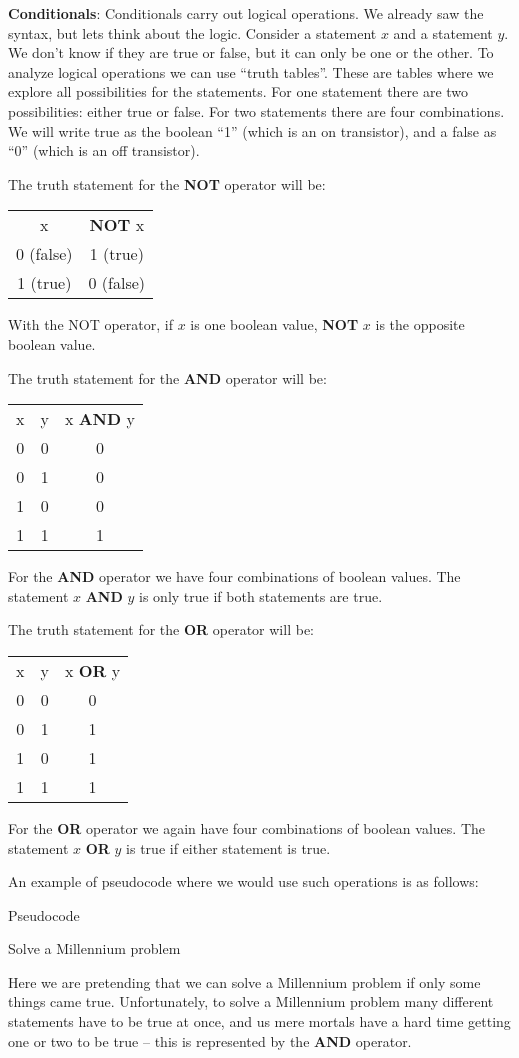 \documentclass[reqno]{amsart}
\theoremstyle{definition}
\begin{document}
\textbf{Conditionals}:  Conditionals carry out logical operations.  We already saw the syntax, but lets think about the logic.  Consider a statement $x$ and a statement $y$.  We don't know if they are true or false, but it can only be one or the other.  To analyze logical operations we can use ``truth tables''.  These are tables where we explore all possibilities for the statements.  For one statement there are two possibilities: either true or false.  For two statements there are four combinations.  We will write true as the boolean ``1'' (which is an on transistor), and a false as ``0'' (which is an off transistor).

The truth statement for the \textbf{NOT} operator will be:

\begin{tabular}{c|c}
x & \textbf{NOT} x\\
0 (false) & 1 (true)\\
1 (true) & 0 (false)
\end{tabular}

With the NOT operator, if $x$ is one boolean value, \textbf{NOT} $x$ is the opposite boolean value.

The truth statement for the \textbf{AND} operator will be:

\begin{tabular}{cc|c}
x & y & x \textbf{AND} y\\
0 & 0 & 0\\
0 & 1 & 0\\
1 & 0 & 0\\
1 & 1 & 1
\end{tabular}

For the \textbf{AND} operator we have four combinations of boolean values.  The statement $x$ \textbf{AND} $y$ is only true if both statements are true.

The truth statement for the \textbf{OR} operator will be:

\begin{tabular}{cc|c}
x & y & x \textbf{OR} y\\
0 & 0 & 0\\
0 & 1 & 1\\
1 & 0 & 1\\
1 & 1 & 1
\end{tabular}

For the \textbf{OR} operator we again have four combinations of boolean values.  The statement $x$ \textbf{OR} $y$ is true if either statement is true.

An example of pseudocode where we would use such operations is as follows:
%
\begin{algorithm}
\caption{Pseudocode}
\begin{algorithmic}
\STATE Solve a Millennium problem
\ENDIF
\end{algorithmic}
\end{algorithm}
%
Here we are pretending that we can solve a Millennium problem if only some things came true.  Unfortunately, to solve a Millennium problem many different statements have to be true at once, and us mere mortals have a hard time getting one or two to be true -- this is represented by the \textbf{AND} operator.
\end{document}

